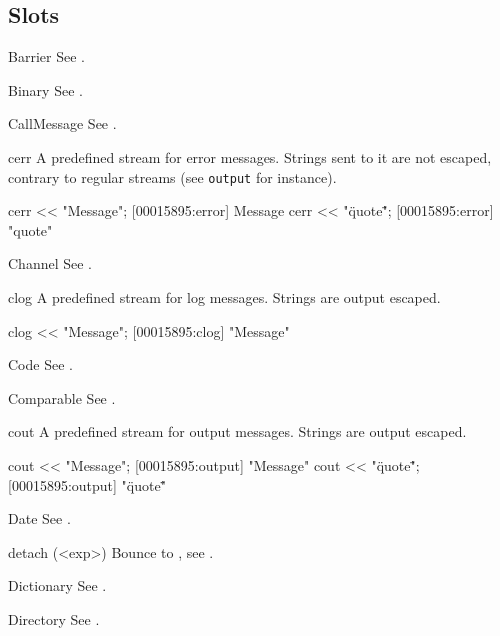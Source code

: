 \subsection{Slots}
\begin{urbiscriptapi}
\item[Barrier] See .


\item[Binary] See .


\item[CallMessage] See .


\item[cerr] A predefined stream for error messages.  Strings sent to
  it are not escaped, contrary to regular streams (see
  \lstinline|output| for instance).
\begin{urbiscript}
cerr << "Message";
[00015895:error] Message
cerr << "\"quote\"";
[00015895:error] "quote"
\end{urbiscript}


\item[Channel] See .


\item[clog] A predefined stream for log messages.  Strings are output
  escaped.
\begin{urbiunchecked}
clog << "Message";
[00015895:clog] "Message"
\end{urbiunchecked}


\item[Code] See .


\item[Comparable] See .


\item[cout] A predefined stream for output messages.  Strings are
  output escaped.
\begin{urbiscript}
cout << "Message";
[00015895:output] "Message"
cout << "\"quote\"";
[00015895:output] "\"quote\""
\end{urbiscript}


\item[Date] See .


\item[detach](<exp>)%
  Bounce to , see .


\item[Dictionary] See .


\item[Directory] See .



\end{urbiscriptapi}
